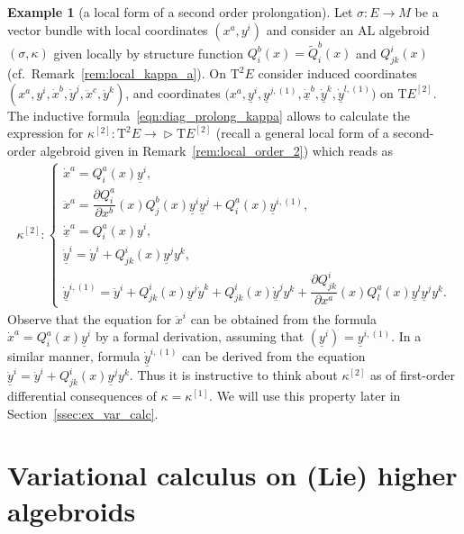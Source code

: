 \documentclass[pdftex]{sigma}
\newcommand{\wt}[1]{\widetilde{#1}} %
\newcommand{\und}{\underline}
\newcommand{\pa}{\partial}
\newcommand{\ra}{\rightarrow}
\newcommand{\E}[1]{E^{[#1]}} %
\newcommand{\T}{\mathrm{T}} %
\newcommand{\TT}[1]{\mathrm{T}^{#1}} %
\def\relto{\rightarrow\!\!\vartriangleright} %
\numberwithin{equation}{section}
\theoremstyle{definition}
\newtheorem{ex}[thm]{Example}
\begin{document}
\begin{ex}[a local form of a second order prolongation] \label{ex:prolong_2}
Let $\sigma\colon E\ra M$ be a vector bundle with local coordinates $(x^a,y^i)$ and consider an AL algebroid $(\sigma,\kappa)$ given locally by structure function $Q^b_i(x)=\wt Q^b_i(x)$ and $Q^i_{jk}(x)$ (cf.\ Remark~\ref{rem:local_kappa_a}). On $\TT 2 E$ consider induced coordinates $(x^a,y^i,\dot x^b,\dot y^j,\ddot x^c,\ddot y^k)$, and coordinates $\big(x^a,\und{y}^i,\und{y}^{j,(1)},\dot{\und{x}}^b,\dot{\und{y}}^k,\dot{\und{y}}^{l,(1)}\big)$ on $\T \E 2$. The inductive formula~\eqref{eqn:diag_prolong_kappa} allows to calculate the expression for $\kappa^{[2]}\colon \TT 2 E\relto \T \E 2$ (recall a general local form of a second-order algebroid given in Remark~\ref{rem:local_order_2}) which reads as
\begin{gather}\label{eqn:kappa_prolong_2}
\kappa^{[2]}\colon
\begin{cases}
\dot{x}^a = Q^a_i(x) \und{y}^i, \\
\ddot{x}^a = \dfrac{\pa Q^a_i}{\pa x^b}(x)Q^b_j(x)\und{y}^i\und{y}^j + Q^a_i(x) \und{y}^{i,(1)}, \\
\dot{\und{x}}^a = Q^{a}_i(x)y^i,\\
\dot{\und{y}}^i = \dot{y}^i + Q^i_{jk}(x) \und{y}^j y^k,\\
\dot{\und{y}}^{i,(1)} = \ddot{y}^i + Q^i_{jk}(x)\und{y}^j \dot{y}^k +Q^i_{jk}(x)\dot{\und{y}}^j {y}^k+ \dfrac{\pa Q^i_{jk}}{\pa x^a}(x)Q^a_l(x)\und{y}^l\und{y}^j {y}^k .
\end{cases}
\end{gather}
Observe that the equation for $\ddot{x}^i$ can be obtained from the formula $\dot{x}^a = Q^a_i(x) \und{y}^i$ by a formal derivation, assuming that $(\und{y}^i)^{\dot{}}=\und{y}^{i,(1)}$. In a similar manner, formula $\dot{\und{y}}^{i,(1)}$ can be derived from the equation $\dot{\und{y}}^i = \dot{y}^i + Q^i_{jk}(x) \und{y}^j y^k$. Thus it is instructive to think about $\kappa^{[2]}$ as of first-order differential consequences of $\kappa=\kappa^{[1]}$. We will use this property later in Section~\ref{ssec:ex_var_calc}.
\end{ex}

\section{Variational calculus on (Lie) higher algebroids}\label{sec:var_calc}
\end{document}
